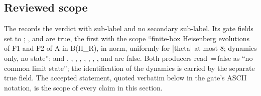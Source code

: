 \subsection{Reviewed scope}
\label{sec:ba2-scope}
The  records the
verdict  with sub-label
 and no secondary sub-label. Its gate
fields set  to
; ,
 and  are
true, the first with the scope ``finite-box Heisenberg evolutions of F1 and F2
of A in B(H\_R), in norm, uniformly for |theta| at most 8; dynamics only, no
state''; and ,
, ,
, ,
, ,
,  and
 are false. Both producers read
\,=\,false as ``no common limit state''; the
identification of the dynamics is carried by the separate true field. The
accepted statement, quoted verbatim below in the gate's ASCII notation, is the
scope of every claim in this section.
